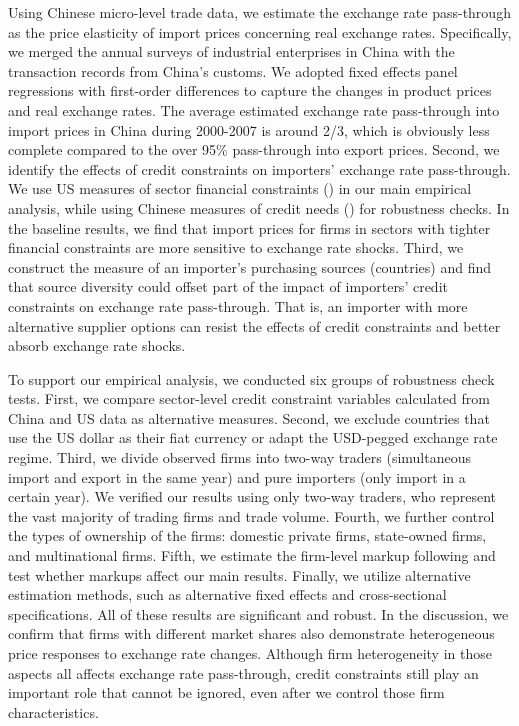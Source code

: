 Using Chinese micro-level trade data, we estimate the exchange rate pass-through as the price elasticity of import prices concerning real exchange rates. Specifically, we merged the annual surveys of industrial enterprises in China with the transaction records from China’s customs. We adopted fixed effects panel regressions with first-order differences to capture the changes in product prices and real exchange rates. The average estimated exchange rate pass-through into import prices in China during 2000-2007 is around 2/3, which is obviously less complete compared to the over 95\% pass-through into export prices. Second, we identify the effects of credit constraints on importers' exchange rate pass-through. We use US measures of sector financial constraints (\cite{manova-wei-zhang2015}) in our main empirical analysis, while using Chinese measures of credit needs (\cite{fan-li-yeaple2015}) for robustness checks. In the baseline results, we find that import prices for firms in sectors with tighter financial constraints are more sensitive to exchange rate shocks. Third, we construct the measure of an importer's purchasing sources (countries) and find that source diversity could offset part of the impact of importers' credit constraints on exchange rate pass-through. That is, an importer with more alternative supplier options can resist the effects of credit constraints and better absorb exchange rate shocks.

To support our empirical analysis, we conducted six groups of robustness check tests. First, we compare sector-level credit constraint variables calculated from China and US data as alternative measures. Second, we exclude countries that use the US dollar as their fiat currency or adapt the USD-pegged exchange rate regime. Third, we divide observed firms into two-way traders (simultaneous import and export in the same year) and pure importers (only import in a certain year). We verified our results using only two-way traders, who represent the vast majority of trading firms and trade volume. Fourth, we further control the types of ownership of the firms: domestic private firms, state-owned firms, and multinational firms. Fifth, we estimate the firm-level markup following \cite{dlw2012} and test whether markups affect our main results. Finally, we utilize alternative estimation methods, such as alternative fixed effects and cross-sectional specifications. All of these results are significant and robust. In the discussion, we confirm that firms with different market shares also demonstrate heterogeneous price responses to exchange rate changes. Although firm heterogeneity in those aspects all affects exchange rate pass-through, credit constraints still play an important role that cannot be ignored, even after we control those firm characteristics. 

